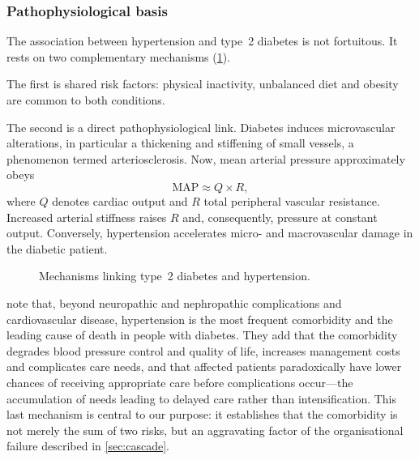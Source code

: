 \documentclass[12pt,a4paper,oneside]{report}
\begin{document}
\subsubsection{Pathophysiological basis}

The association between hypertension and type~2 diabetes is not fortuitous. It rests on two complementary mechanisms (\cref{fig:loop}).

The first is shared risk factors: physical inactivity, unbalanced diet and obesity are common to both conditions.

The second is a direct pathophysiological link. Diabetes induces microvascular alterations, in particular a thickening and stiffening of small vessels, a phenomenon termed arteriosclerosis. Now, mean arterial pressure approximately obeys
\begin{equation}
  \mathrm{MAP} \approx Q \times R,
\end{equation}
where $Q$ denotes cardiac output and $R$ total peripheral vascular resistance. Increased arterial stiffness raises $R$ and, consequently, pressure at constant output. Conversely, hypertension accelerates micro- and macrovascular damage in the diabetic patient.

\begin{figure}[htbp]
\centering
{}
\caption{Mechanisms linking type~2 diabetes and hypertension.}\label{fig:loop}
\end{figure}

\textcite{hinneh2023} note that, beyond neuropathic and nephropathic complications and cardiovascular disease, hypertension is the most frequent comorbidity and the leading cause of death in people with diabetes. They add that the comorbidity degrades blood pressure control and quality of life, increases management costs and complicates care needs, and that affected patients paradoxically have lower chances of receiving appropriate care before complications occur---the accumulation of needs leading to delayed care rather than intensification. This last mechanism is central to our purpose: it establishes that the comorbidity is not merely the sum of two risks, but an aggravating factor of the organisational failure described in \cref{sec:cascade}.
\end{document}
